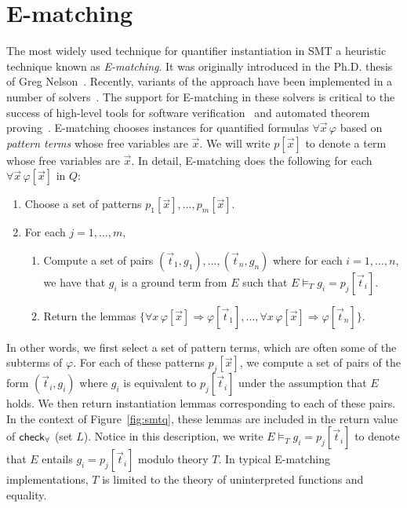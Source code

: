 \documentclass{easychair}
\begin{document}
\section{E-matching}
\label{sec:ematching}

The most widely used technique for quantifier instantiation in SMT a heuristic technique known as \emph{E-matching}.
It was originally introduced in the Ph.D. thesis of Greg Nelson~\cite{Nelson:1980:TPV:909447}.
Recently, variants of the approach have been implemented in a number of solvers~\cite{Detlefs03simplify:a,DBLP:conf/cav/BarrettT07,Z3,DBLP:conf/cade/BoutonODF09,CVC4-CAV-11,DBLP:conf/lpar/Rummer12}.
The support for E-matching in these solvers is critical to the success of high-level tools for 
software verification~\cite{DBLP:conf/icse/Leino04,DBLP:conf/itp/ChapmanS14} and automated theorem proving~\cite{blanchette2013extending,bobot2011why3}.
E-matching chooses instances for quantified formulas $\forall \vec x\, \varphi$
based on \emph{pattern terms} whose free variables are $\vec x$.
We will write $p[ \vec x ]$ to denote a term whose free variables are $\vec x$.
In detail, 
E-matching does the following for each $\forall \vec x\, \varphi[ \vec x ]$ in $Q$:
\begin{enumerate}
\item Choose a set of patterns $p_1[ \vec x ], \ldots, p_m[ \vec x ]$.
\item For each $j = 1, \ldots, m$,
\begin{enumerate}
\item Compute a set of pairs $(\vec t_{1},g_{1}), \ldots, (\vec t_{n}, g_{n})$ 
where for each $i = 1, \ldots, n$, we have that $g_i$ is a ground term from $E$ such that $E \models_T g_{i} = p_j[ \vec t_{i} ]$.
\item Return the lemmas $\{ \forall x\, \varphi[\vec x] \Rightarrow \varphi[\vec t_{1}], \ldots, \forall x\, \varphi[\vec x] \Rightarrow \varphi[\vec t_{n}] \}$.
\end{enumerate}
\end{enumerate}

In other words, we first select a set of pattern terms, which are often some of the subterms of $\varphi$.
For each of these patterns $p_j[ \vec x ]$, we compute a set of pairs of the form $( \vec t_i, g_i )$ where 
$g_i$ is equivalent to $p_j[ \vec t_i ]$ under the assumption that $E$ holds.
We then return instantiation lemmas corresponding to each of these pairs. 
In the context of Figure~\ref{fig:smtq}, these lemmas are included in the return value of $\small\mathsf{check}_\forall$ (set $L$).
Notice in this description, we write $E \models_T g_{i} = p_j[ \vec t_{i} ]$ to denote that $E$ entails
$g_{i} = p_j[ \vec t_{i} ]$ modulo theory $T$.  In typical E-matching implementations, $T$ is limited to the theory of uninterpreted functions and equality.
\end{document}
